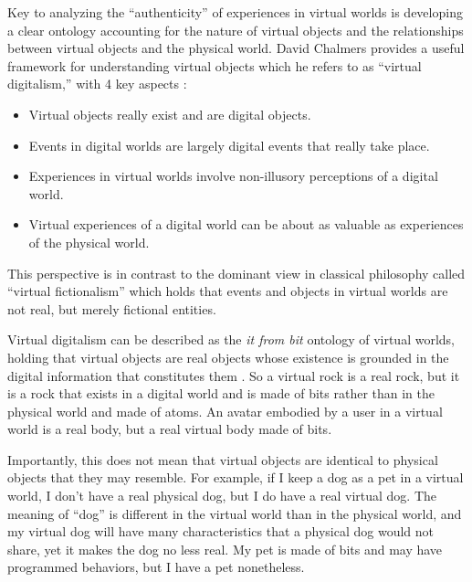 Key to analyzing the ``authenticity'' of experiences in virtual worlds is
developing a clear ontology accounting for the nature of virtual objects and the
relationships between virtual objects and the physical world. David Chalmers
provides a useful framework for understanding virtual objects which he refers 
to as ``virtual digitalism,'' with 4 key aspects \citep{Chalmers2017-CHATVA-3}:
\begin{itemize}
    \item Virtual objects really exist and are digital objects.
    \item Events in digital worlds are largely digital events that really take
          place.
    \item Experiences in virtual worlds involve non-illusory perceptions of a
          digital world.
    \item Virtual experiences of a digital world can be about as valuable as
          experiences of the physical world.
\end{itemize}
This perspective is in contrast to the dominant view in classical philosophy
called ``virtual fictionalism'' which holds that events and objects in virtual
worlds are not real, but merely fictional entities. 

Virtual digitalism can be described as the \emph{it from bit} ontology of
virtual worlds, holding that virtual objects are real objects whose existence is
grounded in the digital information that constitutes them
\citep{Chalmers2022-CHARVW}. So a virtual rock is a real rock, but it is a rock
that exists in a digital world and is made of bits rather than in the physical
world and made of atoms. An avatar embodied by a user in a virtual world is a
real body, but a real virtual body made of bits.

Importantly, this does not mean that virtual objects are identical to physical
objects that they may resemble. For example, if I keep a dog as a pet in a 
virtual world, I don't have a real physical dog, but I do have a real virtual
dog. The meaning of ``dog'' is different in the virtual world than in the
physical world, and my virtual dog will have many characteristics that a
physical dog would not share, yet it makes the dog no less real. My pet is made
of bits and may have programmed behaviors, but I have a pet nonetheless.


